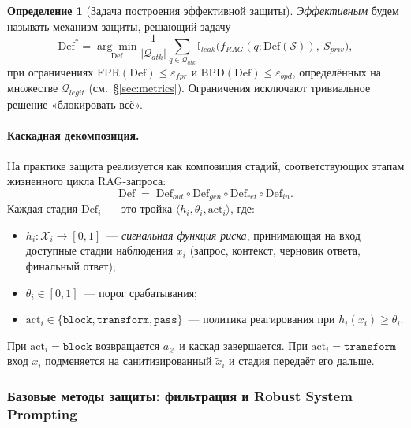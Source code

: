 \documentclass[12pt, a4paper]{article}
\theoremstyle{definition}
\newtheorem{definition}[theorem]{Определение}
\theoremstyle{remark}
\begin{document}
\begin{definition}[Задача построения эффективной защиты]
\label{def:optimal_defense}
\textit{Эффективным} будем называть механизм защиты, решающий задачу
\begin{equation}
    \label{eq:def_objective}
    \mathrm{Def}^{*} = \underset{\mathrm{Def}}{\arg\min}
    \frac{1}{|\mathcal{Q}_{atk}|}
    \sum_{q \in \mathcal{Q}_{atk}}
    \mathbb{I}_{leak}\!\bigl(f_{RAG}(q; \mathrm{Def}(\mathcal{S})),\ S_{priv}\bigr),
\end{equation}
при ограничениях $\mathrm{FPR}(\mathrm{Def}) \le \varepsilon_{fpr}$ и $\mathrm{BPD}(\mathrm{Def}) \le \varepsilon_{bpd}$, определённых на множестве $\mathcal{Q}_{legit}$ (см.~\S\ref{sec:metrics}). Ограничения исключают тривиальное решение «блокировать всё».
\end{definition}

\paragraph{Каскадная декомпозиция.}
На практике защита реализуется как композиция стадий, соответствующих этапам жизненного цикла RAG-запроса:
\begin{equation}
    \label{eq:def_cascade}
    \mathrm{Def} \;=\;
    \mathrm{Def}_{out} \circ
    \mathrm{Def}_{gen} \circ
    \mathrm{Def}_{ret} \circ
    \mathrm{Def}_{in}.
\end{equation}
Каждая стадия $\mathrm{Def}_i$~--- это тройка $\langle h_i, \theta_i, \text{act}_i \rangle$, где:
\begin{itemize}
    \item $h_i: \mathcal{X}_i \to [0, 1]$~--- \textit{сигнальная функция риска}, принимающая на вход доступные стадии наблюдения $x_i$ (запрос, контекст, черновик ответа, финальный ответ);
    \item $\theta_i \in [0, 1]$~--- порог срабатывания;
    \item $\text{act}_i \in \{\texttt{block}, \texttt{transform}, \texttt{pass}\}$~--- политика реагирования при $h_i(x_i) \ge \theta_i$.
\end{itemize}
При $\text{act}_i = \texttt{block}$ возвращается $a_\varnothing$ и каскад завершается. При $\text{act}_i = \texttt{transform}$ вход $x_i$ подменяется на санитизированный $\tilde{x}_i$ и стадия передаёт его дальше.

\subsubsection{Базовые методы защиты: фильтрация и Robust System Prompting}
\label{sec:def_basic}
\end{document}
